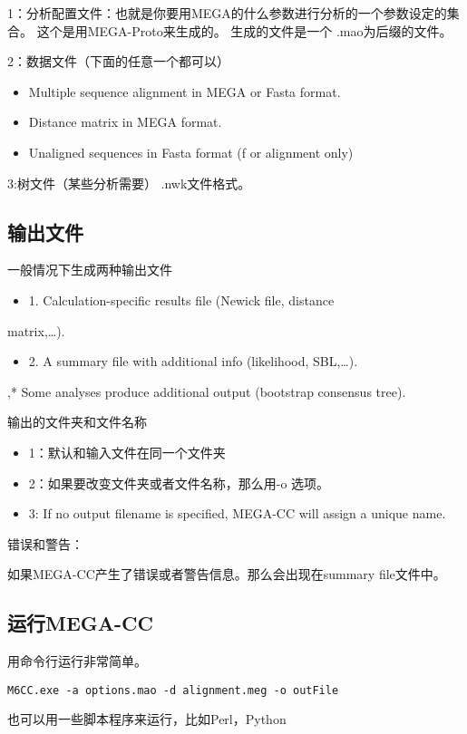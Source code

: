 \documentclass{ctexart}
\begin{document}
1：分析配置文件：也就是你要用MEGA的什么参数进行分析的一个参数设定的集合。
这个是用MEGA-Proto来生成的。
生成的文件是一个 .mao为后缀的文件。

2：数据文件（下面的任意一个都可以）
\begin{itemize}
\item Multiple sequence alignment in MEGA or Fasta format.
\item Distance matrix in MEGA format.
\item Unaligned sequences in Fasta format (f or alignment only)
\end{itemize}

3:树文件（某些分析需要） .nwk文件格式。
\subsection{输出文件}
\label{sec-3-3}

一般情况下生成两种输出文件

\begin{itemize}
\item 1. Calculation-specific results file (Newick file, distance
\end{itemize}
  matrix,…). 
\begin{itemize}
\item 2. A summary file with additional info (likelihood, SBL,…).
\end{itemize}
  ,* Some analyses produce additional output (bootstrap consensus 
  tree).
 
输出的文件夹和文件名称

\begin{itemize}
\item 1：默认和输入文件在同一个文件夹
\item 2：如果要改变文件夹或者文件名称，那么用-o 选项。
\item 3: If no output filename is specified, MEGA-CC will assign a unique 
  name.
\end{itemize}

错误和警告：

如果MEGA-CC产生了错误或者警告信息。那么会出现在summary file文件中。
\subsection{运行MEGA-CC}
\label{sec-3-4}

用命令行运行非常简单。

\lstset{frame=single,frameround=tttt,language=Perl}
\begin{lstlisting}
M6CC.exe -a options.mao -d alignment.meg -o outFile
\end{lstlisting}
也可以用一些脚本程序来运行，比如Perl，Python
\end{document}
